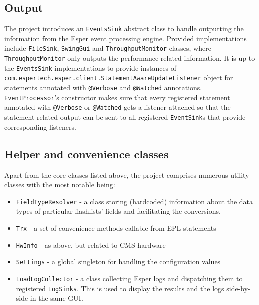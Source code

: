 \subsection{Output}

The project introduces an \texttt{EventsSink} abstract class to handle outputting the information from the Esper event processing engine. Provided implementations include \texttt{FileSink}, \texttt{SwingGui} and \texttt{ThroughputMonitor} classes, where \texttt{ThroughputMonitor} only outputs the performance-related information. It is up to the \texttt{EventsSink} implementations to provide instances of \texttt{com.espertech.esper.client.StatementAwareUpdateListener} object for statements annotated with \texttt{@Verbose} and \texttt{@Watched} annotations. 
\texttt{EventProcessor}'s constructor makes sure that every registered statement annotated with \texttt{@Verbose} or \texttt{@Watched} gets a listener attached so that the statement-related output can be sent to all registered \texttt{EventSink}s that provide corresponding listeners.


\subsection{Helper and convenience classes}

Apart from the core classes listed above, the project comprises numerous utility classes with the most notable being:

\begin{itemize}
	\item \texttt{FieldTypeResolver} - a class storing (hardcoded) information about the data types of particular flashlists' fields and facilitating the conversions.
	\item \texttt{Trx} - a set of convenience methods callable from EPL statements
	\item \texttt{HwInfo} - as above, but related to CMS hardware
	\item \texttt{Settings} - a global singleton for handling the configuration values
	\item \texttt{LoadLogCollector} - a class collecting Esper logs and dispatching them to registered \texttt{LogSinks}. This is used to display the results and the logs side-by-side in the same GUI.
\end{itemize}